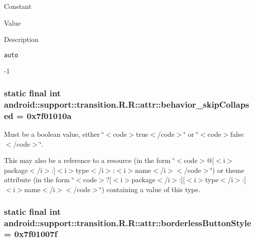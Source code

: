 Constant

Value

Description 

{\tt auto}

-1\hypertarget{classandroid_1_1support_1_1transition_1_1_r_1_1attr_595748d655f8745acf0cfc8756af3b89}{
\subsubsection[{behavior\_\-skipCollapsed}]{\setlength{\rightskip}{0pt plus 5cm}static final int android::support::transition.R.R::attr::behavior\_\-skipCollapsed = 0x7f01010a}}
\label{classandroid_1_1support_1_1transition_1_1_r_1_1attr_595748d655f8745acf0cfc8756af3b89}


Must be a boolean value, either \char`\"{}$<$code$>$true$<$/code$>$\char`\"{} or \char`\"{}$<$code$>$false$<$/code$>$\char`\"{}. 

This may also be a reference to a resource (in the form \char`\"{}$<$code$>$@\mbox{[}$<$i$>$package$<$/i$>$:\mbox{]}$<$i$>$type$<$/i$>$:$<$i$>$name$<$/i$>$$<$/code$>$\char`\"{}) or theme attribute (in the form \char`\"{}$<$code$>$?\mbox{[}$<$i$>$package$<$/i$>$:\mbox{]}\mbox{[}$<$i$>$type$<$/i$>$:\mbox{]}$<$i$>$name$<$/i$>$$<$/code$>$\char`\"{}) containing a value of this type. \hypertarget{classandroid_1_1support_1_1transition_1_1_r_1_1attr_9f6db60432f7cfa2b8a38a5c2dfb9444}{
\subsubsection[{borderlessButtonStyle}]{\setlength{\rightskip}{0pt plus 5cm}static final int android::support::transition.R.R::attr::borderlessButtonStyle = 0x7f01007f}}
\label{classandroid_1_1support_1_1transition_1_1_r_1_1attr_9f6db60432f7cfa2b8a38a5c2dfb9444}


